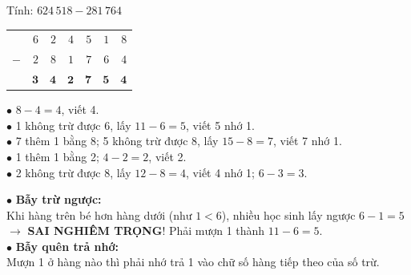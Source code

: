 \documentclass[14pt,a4paper,oneside]{extbook}
\begin{document}
\noindent
\begin{minipage}[t]{0.53\textwidth}
  \begin{tcolorbox}[
    enhanced,
    title={\footnotesize\bfseries\color{white}\faCheckCircle\ Ví dụ thực hành chuẩn mực},
    colback=green!2!white,
    colframe=green!60!black,
    arc=2.5mm, boxrule=0.8pt, top=1.8mm, bottom=1.8mm, left=2.2mm, right=2.2mm
  ]
    \footnotesize
    Tính: $624\,518 - 281\,764$\\
    \begin{center}
      \begin{tabular}{c@{\,}r@{\,}r@{\,}r@{\,}r@{\,}r@{\,}r}
        & $6$ & $2$ & $4$ & $5$ & $1$ & $8$ \\
      $-$ & $2$ & $8$ & $1$ & $7$ & $6$ & $4$ \\
      \hline
        & $\mathbf{3}$ & $\mathbf{4}$ & $\mathbf{2}$ & $\mathbf{7}$ & $\mathbf{5}$ & $\mathbf{4}$
      \end{tabular}
    \end{center}
    $\bullet$ $8 - 4 = 4$, viết 4.\\
    $\bullet$ 1 không trừ được 6, lấy $11 - 6 = 5$, viết 5 nhớ 1.\\
    $\bullet$ 7 thêm 1 bằng 8; 5 không trừ được 8, lấy $15 - 8 = 7$, viết 7 nhớ 1.\\
    $\bullet$ 1 thêm 1 bằng 2; $4 - 2 = 2$, viết 2.\\
    $\bullet$ 2 không trừ được 8, lấy $12 - 8 = 4$, viết 4 nhớ 1; $6 - 3 = 3$.
  \end{tcolorbox}
\end{minipage}%
\hfill
\begin{minipage}[t]{0.45\textwidth}
  \begin{tcolorbox}[
    enhanced,
    title={\footnotesize\bfseries\color{white}\faExclamationTriangle\ Mẹo tránh bẫy trắc nghiệm},
    colback=red!2!white,
    colframe=red!70!black,
    arc=2.5mm, boxrule=0.8pt, top=1.8mm, bottom=1.8mm, left=2.2mm, right=2.2mm
  ]
    \footnotesize
    $\bullet$ \textbf{Bẫy trừ ngược:}\\
    Khi hàng trên bé hơn hàng dưới (như $1 < 6$), nhiều học sinh lấy ngược $6 - 1 = 5$ $\rightarrow$ \textbf{SAI NGHIÊM TRỌNG}! Phải mượn 1 thành $11 - 6 = 5$.\\
    $\bullet$ \textbf{Bẫy quên trả nhớ:}\\
    Mượn 1 ở hàng nào thì phải nhớ trả 1 vào chữ số hàng tiếp theo của số trừ.
  \end{tcolorbox}
\end{minipage}
\end{document}
